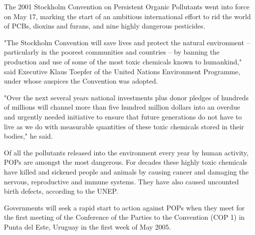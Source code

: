 \documentclass[a4paper]{article}
\begin{document}

The 2001 Stockholm Convention on Persistent Organic Pollutants went into force on May 17,
marking the start of an ambitious international effort to rid the world of PCBs, dioxins and
furans, and nine highly dangerous pesticides.

"The Stockholm Convention will save lives and protect the natural environment -- particularly in
the poorest communities and countries -- by banning the production and use of some of the most toxic
chemicals known to humankind," said Executive Klaus Toepfer of the United Nations Environment Programme,
under whose auspices the Convention was adopted.

"Over the next several years national investments plus donor pledges of hundreds of millions will
channel more than five hundred million dollars into an overdue and urgently needed initiative to ensure
that future generations do not have to live as we do with measurable quantities of these toxic chemicals
stored in their bodies," he said.

Of all the pollutants released into the environment every year by human activity, POPs are amongst the
most dangerous. For decades these highly toxic chemicals have killed and sickened people and animals by
causing cancer and damaging the nervous, reproductive and immune systems. They have also caused uncounted
birth defects, according to the UNEP.

Governments will seek a rapid start to action against POPs when they meet for the first meeting of the
Conference of the Parties to the Convention (COP 1) in Punta del Este, Uruguay in the first week of May
2005.
\end{document}
